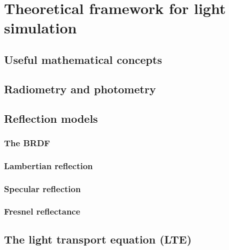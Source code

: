 \chapter{Theoretical framework for light simulation}

\section{Useful mathematical concepts}

\section{Radiometry and photometry}

\section{Reflection models}

\subsection{The BRDF}

\subsection{Lambertian reflection}

\subsection{Specular reflection}

\subsection{Fresnel reflectance}

\section{The light transport equation (LTE)}

